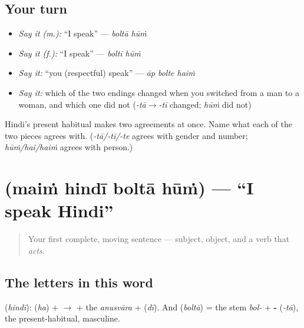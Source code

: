 \subsection*{Your turn}
\begin{itemize}
\raggedright
  \item \emph{Say it (m.):} \textquotedblleft{}I speak\textquotedblright{} — \emph{boltā hūṁ}
  \item \emph{Say it (f.):} \textquotedblleft{}I speak\textquotedblright{} — \emph{boltī hūṁ}
  \item \emph{Say it:} \textquotedblleft{}you (respectful) speak\textquotedblright{} — \emph{āp bolte haiṁ}
  \item \emph{Say it:} which of the two endings changed when you switched from a man to a woman, and which one did not (\emph{-tā}$\to$\emph{-tī} changed; \emph{hūṁ} did not)
\end{itemize}

\begin{tcolorbox}[breakable,colback=teal!4,colframe=teal!35!black,title={Before you move on}]
Hindi's present habitual makes two agreements at once. Name what each of the two pieces agrees with. (\emph{-tā/-tī/-te} agrees with gender and number; \emph{hūṁ/hai/haiṁ} agrees with person.)
\end{tcolorbox}
\section[\texorpdfstring{\hi{मैं} \hi{हिंदी} \hi{बोलता} \hi{हूँ} (maiṁ hindī boltā hūṁ)}{मैं हिंदी बोलता हूँ (maiṁ hindī boltā hūṁ)}]{    (maiṁ hindī boltā hūṁ) — \textquotedblleft{}I speak Hindi\textquotedblright{}}

\label{lesson:HI-C05-main-hindi-bolta-hun}



\begin{quote}
Your first complete, moving sentence — subject, object, and a verb that \emph{acts}.
\end{quote}

\subsection*{The letters in this word}
\textbf{} (\emph{hindī}): \textbf{} (\emph{ha}) + \textbf{}$\to$\textbf{} + the \emph{anusvāra} \textbf{} + \textbf{} (\emph{dī}). And \textbf{} (\emph{boltā}) = the stem \emph{bol-} + \textbf{-} (\emph{-tā}), the present-habitual, masculine.

